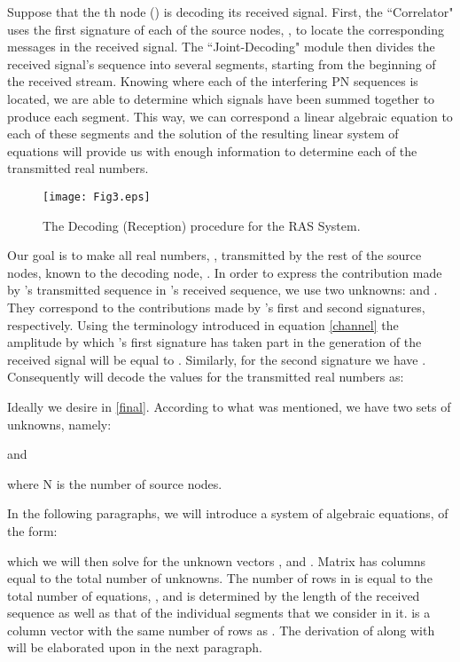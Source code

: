 \documentclass[conference]{IEEEtran}
\begin{document}
Suppose that the th node () is decoding its received signal. First, the ``Correlator" uses the first signature of each of the source nodes,  , to locate the corresponding messages in the received signal. The ``Joint-Decoding" module then divides the received signal's sequence into several segments, starting from the beginning of the received stream. Knowing where each of the interfering PN sequences is located, we are able to determine which signals have been summed together to produce each segment. This way, we can correspond a linear algebraic equation to each of these segments and the solution of the resulting linear system of equations will provide us with enough information to determine each of the transmitted real numbers. 

\begin{figure}[tp]
\centering
\texttt{[image: Fig3.eps]}
\caption{The Decoding (Reception) procedure for the RAS System.}
\label{fig:BD}
\end{figure}

Our goal is to make all real numbers, ,  transmitted by the rest of the source nodes, known to the decoding node, . In order to express the contribution made by 's transmitted sequence in 's received sequence, we use two unknowns:  and . They correspond to the contributions made by 's first and second signatures, respectively. Using the terminology introduced in equation \ref{channel} the amplitude by which 's first signature has taken part in the generation of the received signal will be equal to . Similarly, for the second signature we have . Consequently  will decode the values for the transmitted real numbers as:


Ideally we desire  in \ref{final}. According to what was mentioned, we have two sets of  unknowns, namely: 

and

where N is the number of source nodes. 

In the following paragraphs, we will introduce a system of algebraic equations, of the form:

which we will then solve for the unknown vectors , and .
Matrix  has  columns equal to the total number of unknowns. The number of rows in  is equal to the total number of equations, , and is determined by the length of the received sequence as well as that of the individual segments that we consider in it.  is a column vector with the same number of rows as . The derivation of  along with  will be elaborated upon in the next paragraph. 
\end{document}
